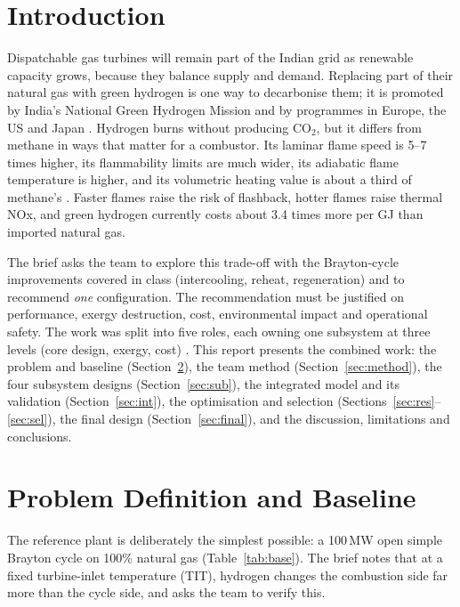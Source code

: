 \documentclass[10pt,a4paper,twocolumn]{article}
\begin{document}
\section{Introduction}
Dispatchable gas turbines will remain part of the Indian grid as renewable capacity grows, because they balance supply and demand. Replacing part of their natural gas with green hydrogen is one way to decarbonise them; it is promoted by India's National Green Hydrogen Mission and by programmes in Europe, the US and Japan \cite{ps}. Hydrogen burns without producing CO$_2$, but it differs from methane in ways that matter for a combustor. Its laminar flame speed is 5--7 times higher, its flammability limits are much wider, its adiabatic flame temperature is higher, and its volumetric heating value is about a third of methane's \cite{ps}. Faster flames raise the risk of flashback, hotter flames raise thermal NOx, and green hydrogen currently costs about 3.4 times more per GJ than imported natural gas.

The brief \cite{ps} asks the team to explore this trade-off with the Brayton-cycle improvements covered in class (intercooling, reheat, regeneration) and to recommend \emph{one} configuration. The recommendation must be justified on performance, exergy destruction, cost, environmental impact and operational safety. The work was split into five roles, each owning one subsystem at three levels (core design, exergy, cost) \cite{ps,plan}. This report presents the combined work: the problem and baseline (Section~\ref{sec:prob}), the team method (Section~\ref{sec:method}), the four subsystem designs (Section~\ref{sec:sub}), the integrated model and its validation (Section~\ref{sec:int}), the optimisation and selection (Sections~\ref{sec:res}--\ref{sec:sel}), the final design (Section~\ref{sec:final}), and the discussion, limitations and conclusions.

\section{Problem Definition and Baseline}\label{sec:prob}
The reference plant is deliberately the simplest possible: a 100\,MW open simple Brayton cycle on 100\% natural gas (Table~\ref{tab:base}). The brief notes that at a fixed turbine-inlet temperature (TIT), hydrogen changes the combustion side far more than the cycle side, and asks the team to verify this.
\end{document}
